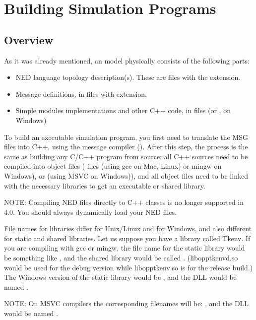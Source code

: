 \chapter{Building Simulation Programs}
\label{cha:building-simulation-programs}

\section{Overview}

As it was already mentioned, an {\opp} model physically consists of
the following parts:

\begin{itemize}
  \item{NED language topology description(s). These
      are files with the  extension.}
  \item{Message definitions, in files
      with  extension.}
  \item{Simple modules implementations and other C++ code, in 
        files (or , on Windows)}
\end{itemize}


To build an executable simulation program,
you first need to translate the MSG files
into C++, using the message compiler ().
After this step, the process is the same as building any C/C++
program from source: all C++ sources need to be compiled into object files
( files (using gcc on Mac, Linux) or mingw on Windows), or  (using MSVC on Windows)),
and all object files need to be linked with the necessary libraries to get
an executable or shared library.

NOTE: Compiling NED files directly to C++ classes is no longer supported in
{\opp} 4.0. You should always dynamically load your NED files.

File names for libraries differ for Unix/Linux and for Windows,
and also different for static and shared libraries.
Let us suppose you have a library called Tkenv.
If you are compiling with gcc or mingw, the file name for the static library
would be something like ,
and the shared library would be called .
(libopptkenvd.so would be used for the debug version while libopptkenv.so
is for the release build.) The Windows version of the static library would
be , and the DLL would be named .

NOTE: On MSVC compilers the corresponding filenames will be:
, and the DLL would be named .

